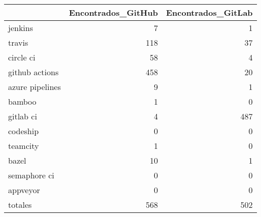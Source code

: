 \begin{tabular}{lrr}
\toprule
{} &  Encontrados\_GitHub &  Encontrados\_GitLab \\
\midrule
jenkins         &                   7 &                   1 \\
travis          &                 118 &                  37 \\
circle ci       &                  58 &                   4 \\
github actions  &                 458 &                  20 \\
azure pipelines &                   9 &                   1 \\
bamboo          &                   1 &                   0 \\
gitlab ci       &                   4 &                 487 \\
codeship        &                   0 &                   0 \\
teamcity        &                   1 &                   0 \\
bazel           &                  10 &                   1 \\
semaphore ci    &                   0 &                   0 \\
appveyor        &                   0 &                   0 \\
totales         &                 568 &                 502 \\
\bottomrule
\end{tabular}
